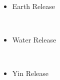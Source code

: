 \documentclass[a4paper,12pt]{article}
\begin{document}
\begin{itemize}
\item Earth Release
\end{itemize}\\ \par \vspace{0.5cm}

\begin{itemize}
\item Water Release
\end{itemize}\\ \par \vspace{0.5cm}

\begin{itemize}
\item Yin Release
\end{itemize}\\ \par \vspace{0.5cm}
\end{document}
